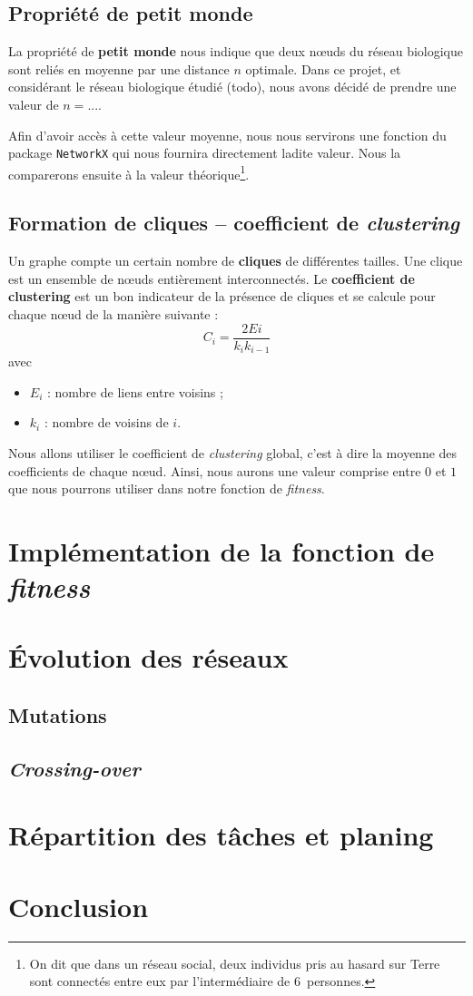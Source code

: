 \subsection{Propriété de petit monde}
La propriété de \textbf{petit monde} nous indique que deux nœuds du réseau biologique sont reliés en moyenne par une distance $n$ optimale. Dans ce projet, et considérant le réseau biologique étudié (todo), nous avons décidé de prendre une valeur de $n=...$.

Afin d'avoir accès à cette valeur moyenne, nous nous servirons une fonction du package \verb?NetworkX? qui nous fournira directement ladite valeur. Nous la comparerons ensuite à la valeur théorique\footnote{On dit que dans un réseau social, deux individus pris au hasard sur Terre sont connectés entre eux par l'intermédiaire de $6$~personnes.}.

\subsection{Formation de cliques -- coefficient de \textit{clustering}}
Un graphe compte un certain nombre de \textbf{cliques} de différentes tailles. Une clique est un ensemble de nœuds entièrement interconnectés. Le \textbf{coefficient de clustering} est un bon indicateur de la présence de cliques et se calcule pour chaque nœud de la manière suivante :
$$ C_i = \frac{2Ei}{k_i k_{i-1}} $$
avec
\begin{itemize}
 \item $E_i$ : nombre de liens entre voisins ;
 \item $k_i$ : nombre de voisins de $i$.
\end{itemize}
Nous allons utiliser le coefficient de \textit{clustering} global, c'est à dire la moyenne des coefficients de chaque nœud. Ainsi, nous aurons une valeur comprise entre $0$ et $1$ que nous pourrons utiliser dans notre fonction de \textit{fitness}.


\section{Implémentation de la fonction de \textit{fitness}}


\section{\'Evolution des réseaux}

\subsection{Mutations}

\subsection{\textit{Crossing-over}}


\section{Répartition des tâches et planing}


\section{Conclusion}

